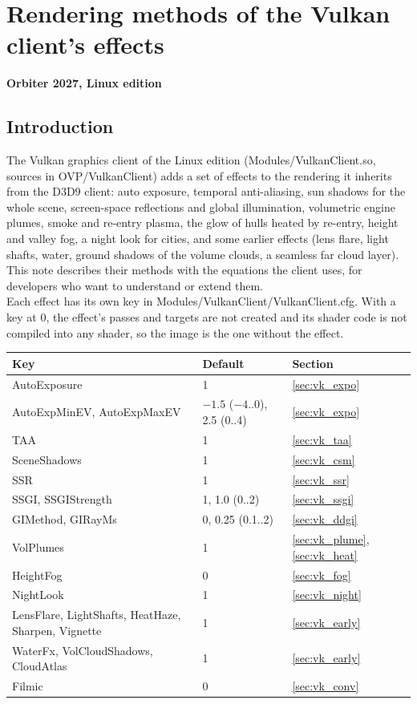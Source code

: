 \documentclass[Orbiter Technical Reference.tex]{subfiles}
\begin{document}
\section{Rendering methods of the Vulkan client's effects}
\textbf{Orbiter 2027, Linux edition}
\begin{sloppypar}


\subsection{Introduction}
The Vulkan graphics client of the Linux edition (Modules/VulkanClient.so, sources in OVP/VulkanClient) adds a set of effects to the rendering it inherits from the D3D9 client: auto exposure, temporal anti-aliasing, sun shadows for the whole scene, screen-space reflections and global illumination, volumetric engine plumes, smoke and re-entry plasma, the glow of hulls heated by re-entry, height and valley fog, a night look for cities, and some earlier effects (lens flare, light shafts, water, ground shadows of the volume clouds, a seamless far cloud layer). This note describes their methods with the equations the client uses, for developers who want to understand or extend them.\\
Each effect has its own key in Modules/VulkanClient/VulkanClient.cfg. With a key at 0, the effect's passes and targets are not created and its shader code is not compiled into any shader, so the image is the one without the effect.

\begin{longtable}{ |p{}|p{}|p{}| }
\hline\rule{0pt}{2ex}
\textbf{Key} & \textbf{Default} & \textbf{Section}\\
\hline\rule{0pt}{2ex}
AutoExposure & 1 & \ref{sec:vk_expo}\\
\hline\rule{0pt}{2ex}
AutoExpMinEV, AutoExpMaxEV & $-1.5$ ($-4$..0), 2.5 (0..4) & \ref{sec:vk_expo}\\
\hline\rule{0pt}{2ex}
TAA & 1 & \ref{sec:vk_taa}\\
\hline\rule{0pt}{2ex}
SceneShadows & 1 & \ref{sec:vk_csm}\\
\hline\rule{0pt}{2ex}
SSR & 1 & \ref{sec:vk_ssr}\\
\hline\rule{0pt}{2ex}
SSGI, SSGIStrength & 1, 1.0 (0..2) & \ref{sec:vk_ssgi}\\
\hline\rule{0pt}{2ex}
GIMethod, GIRayMs & 0, 0.25 (0.1..2) & \ref{sec:vk_ddgi}\\
\hline\rule{0pt}{2ex}
VolPlumes & 1 & \ref{sec:vk_plume}, \ref{sec:vk_heat}\\
\hline\rule{0pt}{2ex}
HeightFog & 0 & \ref{sec:vk_fog}\\
\hline\rule{0pt}{2ex}
NightLook & 1 & \ref{sec:vk_night}\\
\hline\rule{0pt}{2ex}
LensFlare, LightShafts, HeatHaze, Sharpen, Vignette & 1 & \ref{sec:vk_early}\\
\hline\rule{0pt}{2ex}
WaterFx, VolCloudShadows, CloudAtlas & 1 & \ref{sec:vk_early}\\
\hline\rule{0pt}{2ex}
Filmic & 0 & \ref{sec:vk_conv}\\
\hline
\end{longtable}


\end{sloppypar}
\end{document}
